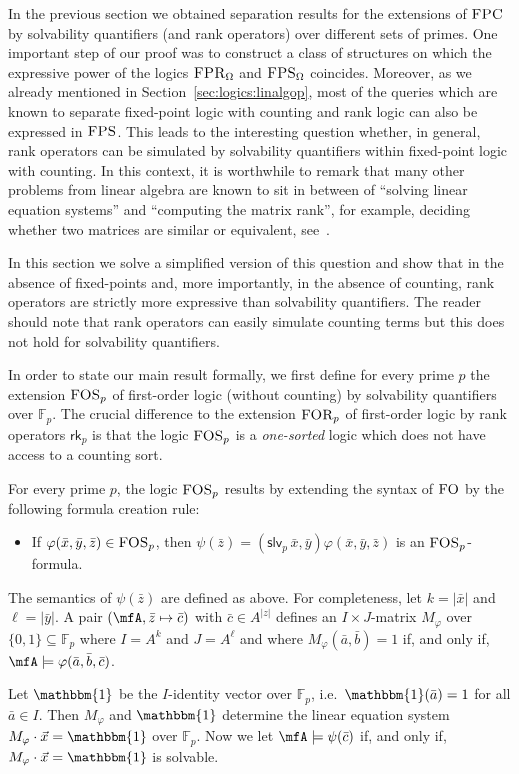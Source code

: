 \documentclass[a4paper,UKenglish]{lipics}
\newcommand{\card}[1]{\ensuremath{|#1|}}
\newcommand{\field}[1]{\mathbb{#1}}
\newcommand{\onevec}{\ensuremath{\mathbbm{1}}}
\newcommand{\logic}[1]{\ensuremath{\textsc{#1}}\xspace}
\newcommand{\FO}{\logic{FO}}
\newcommand{\FPC}{\logic{FPC}}
\newcommand{\FOSp}{\ensuremath{\logic{FOS}_p}\xspace}
\newcommand{\FPS}{\ensuremath{\logic{FPS}}\xspace}
\newcommand{\FPSx}[1]{\ensuremath{\logic{FPS}_{#1}}\xspace}
\newcommand{\FORp}{\ensuremath{\logic{FOR}_p}\xspace}
\newcommand{\FPRx}[1]{\ensuremath{\logic{FPR}_{#1}}\xspace}
\newcommand{\slvp}{\ensuremath{\textsf{slv}_p}\xspace}
\newcommand{\rkp}{\ensuremath{\textsf{rk}_p}\xspace}
\renewcommand{\phi}{\varphi}
\newcommand{\ba}{{\bar a}}
\newcommand{\bb}{{\bar b}}
\newcommand{\bc}{{\bar c}}
\newcommand{\bx}{{\bar x}}
\newcommand{\by}{{\bar y}}
\newcommand{\bz}{{\bar z}}
\newcommand{\vct}[1]{\vec{#1}}
\theoremstyle{plain}
\begin{document}
In the previous section we obtained separation results for the 
extensions of $\FPC$ by solvability quantifiers (and rank operators) over 
different sets of primes.
One important step of our proof was to construct a class of structures on which 
the expressive power of the logics $\FPRx{\Omega}$ and $\FPSx{\Omega}$ 
coincides. 
Moreover, as we already mentioned in Section~\ref{sec:logics:linalgop}, most of 
the queries which are known to separate fixed-point logic with counting and 
rank logic can also be expressed in $\FPS$. 
This leads to the interesting question whether, in general, rank operators can 
be simulated by solvability quantifiers within fixed-point logic with counting.
In this context, it is worthwhile to remark that many other problems from 
linear algebra are known to sit in between of ``solving linear equation 
systems'' and ``computing the matrix rank'', for example, deciding whether two 
matrices are similar or equivalent, see~\cite{Pa10, Ho10, La11}.

\smallskip
In this section we solve a simplified version of this question and show that 
in the absence of fixed-points and, more importantly, in the 
absence of counting, rank operators are strictly more expressive than 
solvability quantifiers. The reader should note that rank 
operators can easily simulate counting terms but this does not hold 
for solvability quantifiers.

In order to state our main result formally, we first define for every
prime $p$ the extension $\FOSp$ of first-order logic (without counting) by 
solvability quantifiers over $\field F_p$. 
The crucial difference to the extension $\FORp$ of first-order logic by rank 
operators $\rkp$ is that the logic $\FOSp$ is a \emph{one-sorted} logic which 
does not have access to a counting sort.

\begin{definition}\label{def:fosp}
For every prime $p$, the logic $\FOSp$ results by extending the syntax of 
$\FO$ by the following
formula creation rule:
\begin{itemize}
 \item If $\phi(\bx,\by,\bz) \in \FOSp$, then
   $\psi(\bz) = (\slvp \, \bx, \by) \phi(\bx,\by, \bz)$ is an 
$\FOSp$-formula.
\end{itemize}
\noindent
The semantics of $\psi(\bz)$ are defined as above. 
For completeness, let $k =\card{\bx}$ and $\ell = \card{\by}$. A pair $(\mfA, 
\bz \mapsto \bc)$ with $\bc \in A^{\card z}$ defines an $I\times J$-matrix 
$M_\phi$ over $\{ 0, 1 \}
\subseteq \field F_p$ where $I = A^k$ and $J = A^\ell$ and where
$M_\phi(\ba,\bb) = 1$ if, and only if, $\mfA \models \phi(\ba,\bb,\bc)$.

Let $\onevec$ be the $I$-identity vector over $\field F_p$, i.e.\ 
$\onevec(\ba) = 1$ for all $\ba \in I$. Then $M_\phi$ and $\onevec$ determine
the linear
equation system $M_\phi \cdot \vct x = \onevec$ over $\field F_p$.
Now we let $\mfA \models \psi(\bc)$ if, and only if, $M_\phi 
\cdot \vct x = \onevec$ is solvable.
\end{definition}
\end{document}
